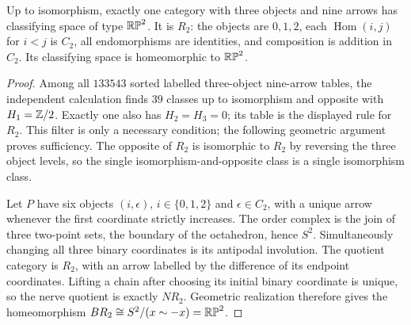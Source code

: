 \begin{theorem}\label{thm:C-RP2-unique}
Up to isomorphism, exactly one category with three objects and nine arrows
has classifying space of type $\mathbb {RP}^2$. It is $R_2$: the objects are
$0,1,2$, each $\operatorname{Hom}(i,j)$ for $i<j$ is $C_2$, all
endomorphisms are identities, and composition is addition in $C_2$.
Its classifying space is homeomorphic to $\mathbb {RP}^2$.
\end{theorem}
\begin{proof}
Among all $133543$ sorted labelled three-object nine-arrow tables, the
independent calculation finds $39$ classes up to isomorphism and opposite
with $H_1=\mathbb Z/2$. Exactly one also has $H_2=H_3=0$; its table is
the displayed rule for $R_2$. This filter is only a necessary condition;
the following geometric argument proves sufficiency. The opposite of
$R_2$ is isomorphic to $R_2$ by reversing the three object levels,
so the single isomorphism-and-opposite class is a single isomorphism class.

Let $P$ have six objects $(i,\epsilon)$, $i\in\{0,1,2\}$ and
$\epsilon\in C_2$, with a unique arrow whenever the first coordinate
strictly increases. The order complex is the join of three two-point
sets, the boundary of the octahedron, hence $S^2$. Simultaneously changing
all three binary coordinates is its antipodal involution. The quotient
category is $R_2$, with an arrow labelled by the difference of its endpoint
coordinates. Lifting a chain after choosing its initial binary coordinate
is unique, so the nerve quotient is exactly $NR_2$. Geometric realization
therefore gives the homeomorphism $BR_2\cong S^2/(x\sim-x)=\mathbb {RP}^2$.
\end{proof}

